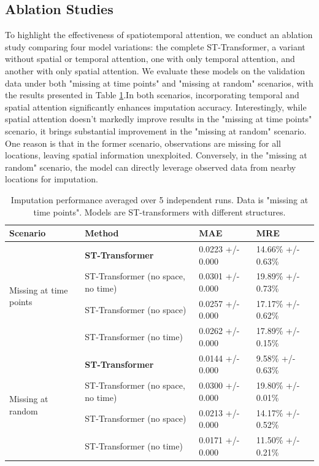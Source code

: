 \documentclass[11pt]{article}
\begin{document}
\subsection{Ablation Studies}

To highlight the effectiveness of spatiotemporal attention, we conduct an ablation study comparing four model variations: the complete ST-Transformer, a variant without spatial or temporal attention, one with only temporal attention, and another with only spatial attention. We evaluate these models on the validation data under both "missing at time points" and "missing at random" scenarios, with the results presented in Table \ref{tab: ablation_study_1}.In both scenarios, incorporating temporal and spatial attention significantly enhances imputation accuracy. Interestingly, while spatial attention doesn't markedly improve results in the "missing at time points" scenario, it brings substantial improvement in the "missing at random" scenario. One reason is that in the former scenario, observations are missing for all locations, leaving spatial information unexploited. Conversely, in the "missing at random" scenario, the model can directly leverage observed data from nearby locations for imputation.

\begin{table}[h!]
    \centering
    \begin{tabularx}{\textwidth}{XXXX}
        \toprule
         Scenario&Method & MAE & MRE \\
        \midrule
        \multirow{4}{*}{Missing at time points}&\textbf{ST-Transformer} & 0.0223 +/- 0.000 & 14.66\% +/- 0.63\%  \\
        &ST-Transformer (no space, no time) & 0.0301 +/- 0.000& 19.89\% +/- 0.73\%\\
        &ST-Transformer (no space) & 0.0257 +/- 0.000& 17.17\% +/- 0.62\% \\
        &ST-Transformer (no time) & 0.0262 +/- 0.000 & 17.89\% +/- 0.15\% \\
        \midrule
        \multirow{4}{*}{Missing at random}&\textbf{ST-Transformer} & 0.0144 +/- 0.000 & 9.58\% +/- 0.63\%  \\
        &ST-Transformer (no space, no time) & 0.0300 +/- 0.000& 19.80\% +/- 0.01\%\\
        &ST-Transformer (no space) & 0.0213 +/- 0.000& 14.17\% +/- 0.52\% \\
        &ST-Transformer (no time) & 0.0171 +/- 0.000 & 11.50\% +/- 0.21\% \\
        \bottomrule

    \end{tabularx}
    \caption{Imputation performance averaged over 5 independent runs. Data is "missing at time points". Models are ST-transformers with different structures.}
    \label{tab: ablation_study_1}
\end{table}
\end{document}

